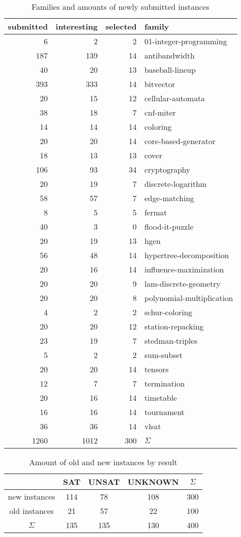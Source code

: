 \documentclass{elsarticle}
\begin{document}
\begin{table}[h]
\centering
\begin{tabular}{rrr||l}
submitted & interesting & selected & family\\
\hline\hline
6 & 2 & 2 & 01-integer-programming\\
187 & 139 & 14 & antibandwidth\\
40 & 20 & 13 & baseball-lineup\\
393 & 333 & 14 & bitvector\\
20 & 15 & 12 & cellular-automata\\
38 & 18 & 7 & cnf-miter\\
14 & 14 & 14 & coloring\\
20 & 20 & 14 & core-based-generator\\
18 & 13 & 13 & cover\\
106 & 93 & 34 & cryptography\\
20 & 19 & 7 & discrete-logarithm\\
58 & 57 & 7 & edge-matching\\
8 & 5 & 5 & fermat\\
40 & 3 & 0 & flood-it-puzzle\\
20 & 19 & 13 & hgen\\
56 & 48 & 14 & hypertree-decomposition\\
20 & 16 & 14 & influence-maximization\\
20 & 20 & 9 & lam-discrete-geometry\\
20 & 20 & 8 & polynomial-multiplication\\
4 & 2 & 2 & schur-coloring\\
20 & 20 & 12 & station-repacking\\
23 & 19 & 7 & stedman-triples\\
5 & 2 & 2 & sum-subset\\
20 & 20 & 14 & tensors\\
12 & 7 & 7 & termination\\
20 & 16 & 14 & timetable\\
16 & 16 & 14 & tournament\\
36 & 36 & 14 & vlsat\\
\hline
1260 & 1012 & 300 & $\Sigma$
\end{tabular}
\caption{Families and amounts of newly submitted instances}
\label{tab:families}
\end{table}

\begin{table}[h]
\centering
\begin{tabular}{c||ccc|c}
 & SAT & UNSAT & UNKNOWN & $\Sigma$\\
\hline\hline
new instances & 114 & 78 & 108 & 300 \\
old instances & 21 & 57 & 22 & 100\\
\hline
$\Sigma$ & 135 & 135 & 130 & 400
\end{tabular}
\caption{Amount of old and new instances by result}
\label{tab:final}
\end{table}
\end{document}
